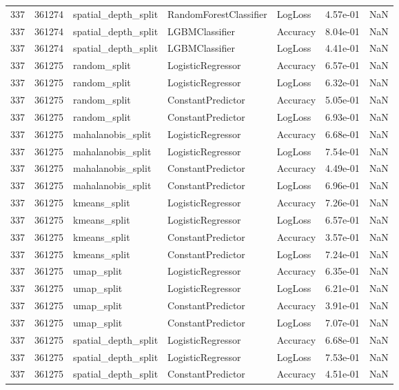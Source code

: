 \begin{tabular}{rrlllrr}
337 & 361274 & spatial\_depth\_split & RandomForestClassifier & LogLoss & 4.57e-01 & NaN \\
337 & 361274 & spatial\_depth\_split & LGBMClassifier & Accuracy & 8.04e-01 & NaN \\
337 & 361274 & spatial\_depth\_split & LGBMClassifier & LogLoss & 4.41e-01 & NaN \\
337 & 361275 & random\_split & LogisticRegressor & Accuracy & 6.57e-01 & NaN \\
337 & 361275 & random\_split & LogisticRegressor & LogLoss & 6.32e-01 & NaN \\
337 & 361275 & random\_split & ConstantPredictor & Accuracy & 5.05e-01 & NaN \\
337 & 361275 & random\_split & ConstantPredictor & LogLoss & 6.93e-01 & NaN \\
337 & 361275 & mahalanobis\_split & LogisticRegressor & Accuracy & 6.68e-01 & NaN \\
337 & 361275 & mahalanobis\_split & LogisticRegressor & LogLoss & 7.54e-01 & NaN \\
337 & 361275 & mahalanobis\_split & ConstantPredictor & Accuracy & 4.49e-01 & NaN \\
337 & 361275 & mahalanobis\_split & ConstantPredictor & LogLoss & 6.96e-01 & NaN \\
337 & 361275 & kmeans\_split & LogisticRegressor & Accuracy & 7.26e-01 & NaN \\
337 & 361275 & kmeans\_split & LogisticRegressor & LogLoss & 6.57e-01 & NaN \\
337 & 361275 & kmeans\_split & ConstantPredictor & Accuracy & 3.57e-01 & NaN \\
337 & 361275 & kmeans\_split & ConstantPredictor & LogLoss & 7.24e-01 & NaN \\
337 & 361275 & umap\_split & LogisticRegressor & Accuracy & 6.35e-01 & NaN \\
337 & 361275 & umap\_split & LogisticRegressor & LogLoss & 6.21e-01 & NaN \\
337 & 361275 & umap\_split & ConstantPredictor & Accuracy & 3.91e-01 & NaN \\
337 & 361275 & umap\_split & ConstantPredictor & LogLoss & 7.07e-01 & NaN \\
337 & 361275 & spatial\_depth\_split & LogisticRegressor & Accuracy & 6.68e-01 & NaN \\
337 & 361275 & spatial\_depth\_split & LogisticRegressor & LogLoss & 7.53e-01 & NaN \\
337 & 361275 & spatial\_depth\_split & ConstantPredictor & Accuracy & 4.51e-01 & NaN \\

\end{tabular}
